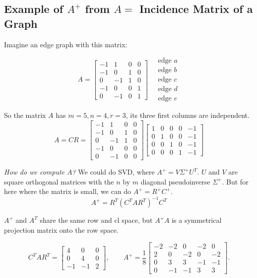 \subsection{Example of \(A^+\) from \(A =\) Incidence Matrix of a Graph  }

Imagine an edge graph with this matrix:

\[
A = 
\begin{bmatrix}
-1 & 1  & 0 & 0 \\
-1 & 0  & 1 & 0 \\
0  & -1 & 1 & 0 \\
-1 & 0  & 0 & 1 \\
0  & -1 & 0 & 1
\end{bmatrix}
\quad
\begin{matrix}
\text{edge }a\\
\text{edge }b\\
\text{edge }c\\
\text{edge }d\\
\text{edge }e
\end{matrix}
\]

So the matrix \(A\) has \(m = 5, n = 4, r = 3\), its three first columns are independent. 
\[
    A = CR = 
    \begin{bmatrix}
-1 & 1  & 0 & 0 \\
-1 & 0  & 1 & 0 \\
0  & -1 & 1 & 0 \\
-1 & 0  & 0 & 0 \\
0  & -1 & 0 & 0
\end{bmatrix}
\begin{bmatrix}
1 & 0 & 0 & 0 & -1 \\
0 & 1 & 0 & 0 & -1 \\
0 & 0 & 1 & 0 & -1 \\
0 & 0 & 0 & 1 & -1
\end{bmatrix}
\]  

\emph{How do we compute \(A\)? } We could do SVD, where \(A^+ = V \Sigma ^+ U^T\). \(U\) and \(V\) are square orthogonal matrices with the \(n\) by \(m\) diagonal pseudoinverse \(\Sigma ^+\). But for here where the matrix is small, we can do \(A^+ = R^+ C^+\). 
\[
    A^+ = R^T (C^T A R^T)^{-1} C^T 
\]  

\(A^+\) and \(A^T\) share the same row and cl space, but \(A^+ A\) is a symmetrical projection matrix onto the row space. 

\[
C^T A R^T
=
\begin{bmatrix}
4 & 0 & 0\\
0 & 4 & 0\\
-1 & -1 & 2
\end{bmatrix},
\qquad
A^+
=
\frac{1}{8}
\begin{bmatrix}
-2 & -2 &  0 & -2 &  0\\
 2 &  0 & -2 &  0 & -2\\
 0 &  3 &  3 & -1 & -1\\
 0 & -1 & -1 &  3 &  3
\end{bmatrix}.
\]

